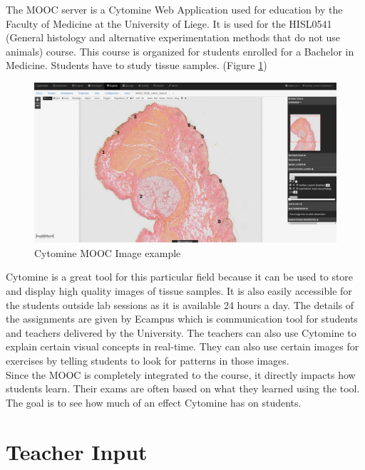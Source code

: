 \documentclass[a4paper,11pt]{report}
\numberwithin{figure}{section} %
\begin{document}
The MOOC server is a Cytomine Web Application used for education by the Faculty of Medicine at the University of Liege.
It is used for the HISL0541 (General histology and alternative experimentation methods that do not use animals) course.
This course is organized for students enrolled for a Bachelor in Medicine.
Students have to study tissue samples. (Figure \ref{fig:lame_example})

      \begin{figure}[H]
      \centering
      \includegraphics[width=.95\linewidth]{images/lame_cytomine.png}
      \caption{Cytomine MOOC Image example}
      \label{fig:lame_example}
      \end{figure}

Cytomine is a great tool for this particular field because it can be used to store and display high quality images of tissue samples.
It is also easily accessible for the students outside lab sessions as it is available 24 hours a day.
The details of the assignments are given by Ecampus which is communication tool for students and teachers delivered by the University.
The teachers can also use Cytomine to explain certain visual concepts in real-time.
They can also use certain images for exercises by telling students to look for patterns in those images.\\

Since the MOOC is completely integrated to the course, it directly impacts how students learn.
Their exams are often based on what they learned using the tool.
The goal is to see how much of an effect Cytomine has on students.


\section{Teacher Input}
\end{document}
